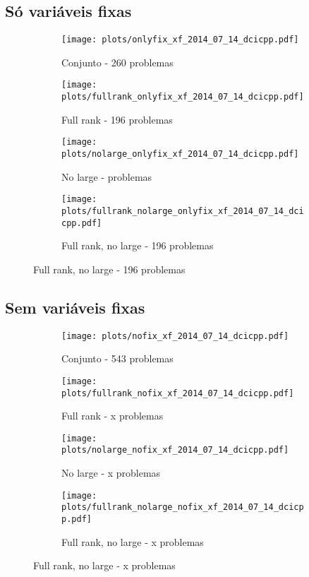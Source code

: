 \documentclass{article}
\begin{document}
\subsection{Só variáveis fixas}
\begin{figure}[H]
  \centering
  \begin{subfigure}{0.48\textwidth}
    \texttt{[image: plots/onlyfix\_xf\_2014\_07\_14\_dcicpp.pdf]}
    \caption{Conjunto - 260 problemas}
  \end{subfigure}
  \begin{subfigure}{0.48\textwidth}
    \texttt{[image: plots/fullrank\_onlyfix\_xf\_2014\_07\_14\_dcicpp.pdf]}
    \caption{Full rank - 196 problemas}
  \end{subfigure}
  \begin{subfigure}{0.48\textwidth}
    \texttt{[image: plots/nolarge\_onlyfix\_xf\_2014\_07\_14\_dcicpp.pdf]}
    \caption{No large - problemas}
  \end{subfigure}
  \begin{subfigure}{0.48\textwidth}
    \texttt{[image: plots/fullrank\_nolarge\_onlyfix\_xf\_2014\_07\_14\_dcicpp.pdf]}
    \caption{Full rank, no large - 196 problemas}
  \end{subfigure}
\end{figure}

\subsection{Sem variáveis fixas}
\begin{figure}[H]
  \centering
  \begin{subfigure}{0.48\textwidth}
    \texttt{[image: plots/nofix\_xf\_2014\_07\_14\_dcicpp.pdf]}
    \caption{Conjunto - 543 problemas}
  \end{subfigure}
  \begin{subfigure}{0.48\textwidth}
    \texttt{[image: plots/fullrank\_nofix\_xf\_2014\_07\_14\_dcicpp.pdf]}
    \caption{Full rank - x problemas}
  \end{subfigure}
  \begin{subfigure}{0.48\textwidth}
    \texttt{[image: plots/nolarge\_nofix\_xf\_2014\_07\_14\_dcicpp.pdf]}
    \caption{No large - x problemas}
  \end{subfigure}
  \begin{subfigure}{0.48\textwidth}
    \texttt{[image: plots/fullrank\_nolarge\_nofix\_xf\_2014\_07\_14\_dcicpp.pdf]}
    \caption{Full rank, no large - x problemas}
  \end{subfigure}
\end{figure}
\end{document}

